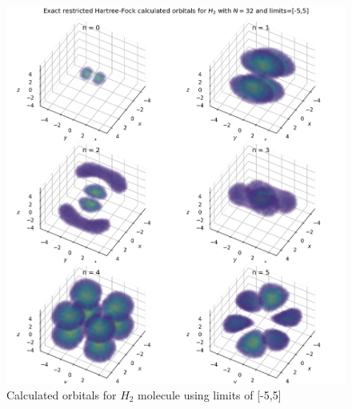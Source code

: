 \documentclass[10pt, oneside, letterpaper]{article}
\begin{document}
\begin{figure}[H]
  \begin{center}
    \includegraphics[scale=0.75]{h2_N32_l5.png}
  \end{center}
  \caption{Calculated orbitals for $H_2$ molecule using limits of [-5,5]}
  \label{h2-plot-l5}
\end{figure}
\end{document}
